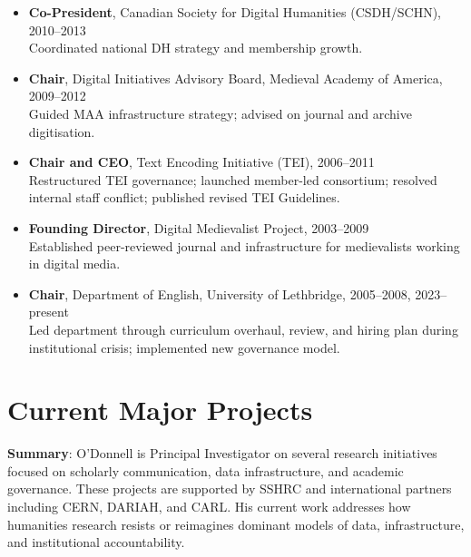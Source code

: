 \documentclass[12pt]{article}
\begin{document}
\begin{itemize}
  \item \textbf{Co-President}, Canadian Society for Digital Humanities (CSDH/SCHN), 2010–2013\\
  Coordinated national DH strategy and membership growth.
  \item \textbf{Chair}, Digital Initiatives Advisory Board, Medieval Academy of America, 2009–2012\\
  Guided MAA infrastructure strategy; advised on journal and archive digitisation.
  \item \textbf{Chair and CEO}, Text Encoding Initiative (TEI), 2006–2011\\
  Restructured TEI governance; launched member-led consortium; resolved internal staff conflict; published revised TEI Guidelines.
  \item \textbf{Founding Director}, Digital Medievalist Project, 2003–2009\\
  Established peer-reviewed journal and infrastructure for medievalists working in digital media.
  \item \textbf{Chair}, Department of English, University of Lethbridge, 2005–2008, 2023–present\\
  Led department through curriculum overhaul, review, and hiring plan during institutional crisis; implemented new governance model.
\end{itemize}

\section*{Current Major Projects}

\textbf{Summary}: O'Donnell is Principal Investigator on several research initiatives focused on scholarly communication, data infrastructure, and academic governance. These projects are supported by SSHRC and international partners including CERN, DARIAH, and CARL. His current work addresses how humanities research resists or reimagines dominant models of data, infrastructure, and institutional accountability.
\end{document}

